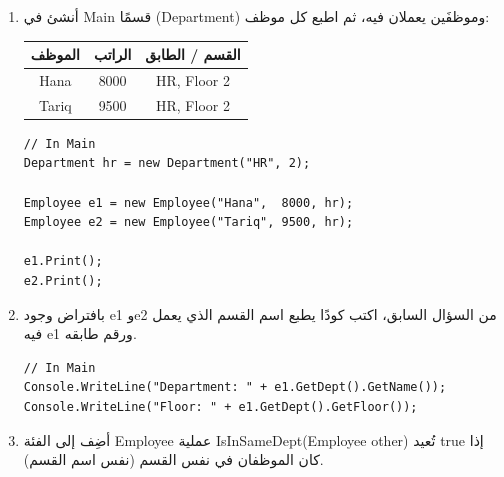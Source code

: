 \documentclass[14pt]{extarticle}
\begin{document}
\begin{enumerate}

\item
أنشئ في \textenglish{Main} قسمًا (\textenglish{Department}) وموظفَين يعملان فيه،
ثم اطبع كل موظف:

\begin{center}
\begin{tabular}{|c|c|c|}
\hline
\textbf{الموظف} & \textbf{الراتب} & \textbf{القسم / الطابق} \\
\hline
\textenglish{Hana}  & \textenglish{8000} & \textenglish{HR, Floor 2} \\
\textenglish{Tariq} & \textenglish{9500} & \textenglish{HR, Floor 2} \\
\hline
\end{tabular}
\end{center}

\ifwithsols
\begin{boxSolution}
\begin{english}
{\small
\begin{verbatim}
// In Main
Department hr = new Department("HR", 2);

Employee e1 = new Employee("Hana",  8000, hr);
Employee e2 = new Employee("Tariq", 9500, hr);

e1.Print();
e2.Print();
\end{verbatim}
}
\end{english}
\end{boxSolution}
\clearpage
\fi

\item
بافتراض وجود \textenglish{e1} و\textenglish{e2} من السؤال السابق،
اكتب كودًا يطبع اسم القسم الذي يعمل فيه \textenglish{e1} ورقم طابقه.

\ifwithsols
\begin{boxSolution}
\begin{english}
{\small
\begin{verbatim}
// In Main
Console.WriteLine("Department: " + e1.GetDept().GetName());
Console.WriteLine("Floor: " + e1.GetDept().GetFloor());
\end{verbatim}
}
\end{english}
\end{boxSolution}
\clearpage
\fi

\item
أضِف إلى الفئة \textenglish{Employee} عملية \textenglish{IsInSameDept(Employee other)}
تُعيد \textenglish{true} إذا كان الموظفان في نفس القسم (نفس اسم القسم).


\end{enumerate}
\end{document}
